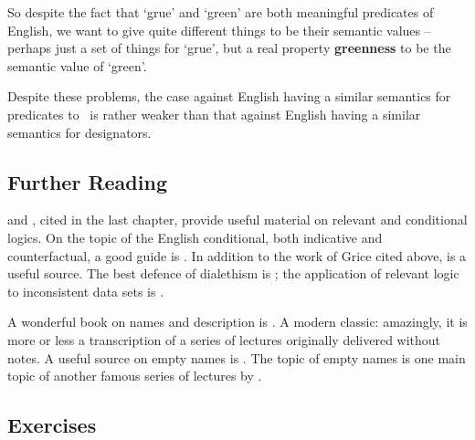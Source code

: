 So despite the fact that `grue' and `green' are both meaningful predicates of English, we want to give quite different things to be their semantic values – perhaps just a set of things for `grue', but a real property \textbf{greenness} to be the semantic value of `green'.

Despite these problems, the case against English having a similar semantics for predicates to \ltwo\ is rather weaker than that against English having a similar semantics for designators.


{\small
\subsection*{Further Reading}


\citet{bevpospa} and \citet{burphilo}, cited in the last chapter, provide useful material on relevant and conditional logics. On the topic of the English conditional, both indicative and counterfactual, a good guide is \citet{benphiguc}. In addition to the work of Grice cited above, \citet{sep-implicature} is a useful source. The best defence of dialethism is \citet{priinco}; the application of relevant logic to inconsistent data sets is \citet{belusefov}.  

A wonderful book on names and description is \citet{krinamne}. A modern classic: amazingly, it is more or less a transcription of a series of lectures originally delivered without notes. A useful source on empty names is \citet{capempna}. The topic of empty names is one main topic of another famous series of lectures by \citet{krirefex}.



\subsection*{Exercises}


\begin{enumerate}
	

\end{enumerate}}
